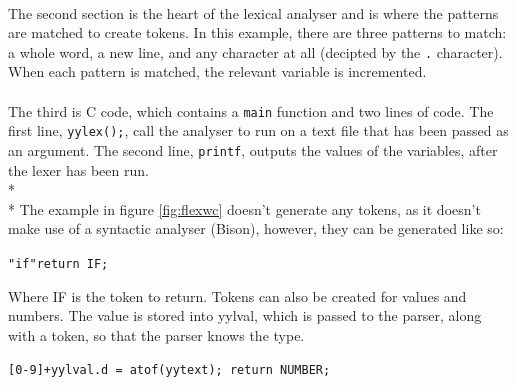 \documentclass[12pt]{report}
\begin{document}
\\
The second section is the heart of the lexical analyser and is where the patterns are matched to create tokens.  In this example, there are three patterns to match: a whole word, a new line, and any character at all (decipted by the \texttt{.} character).  When each pattern is matched, the relevant variable is incremented.\\
\\
The third is C code, which contains a \texttt{main} function and two lines of code.  The first line, \texttt{yylex();}, call the analyser to run on a text file that has been passed as an argument.  The second line, \texttt{printf}, outputs the values of the variables, after the lexer has been run.
\\*
\\*
The example in figure \ref{fig:flexwc} doesn't generate any tokens, as it doesn't make use of a syntactic analyser (Bison), however, they can be generated like so:
\begin{center}
	\texttt{"if"\quad\quad return IF;}
\end{center}
Where IF is the token to return.  Tokens can also be created for values and numbers.  The value is stored into yylval, which is passed to the parser, along with a token, so that the parser knows the type.
\begin{center}
	\texttt{[0-9]+\quad\quad yylval.d = atof(yytext); return NUMBER;}
\end{center}
\end{document}
